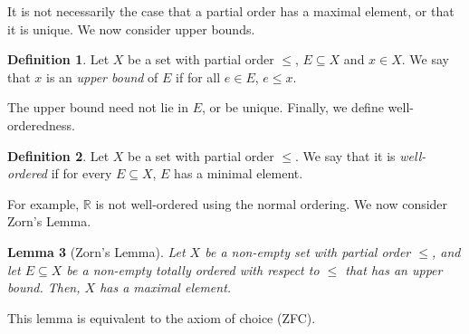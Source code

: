 \documentclass[a4paper, openany]{memoir}
\theoremstyle{definition}
\newtheorem{definition}{Definition}[section]
\theoremstyle{plain}
\newtheorem{lemma}[definition]{Lemma}
\begin{document}
    \noindent It is not necessarily the case that a partial order has a maximal element, or that it is unique. We now consider upper bounds.
    \begin{definition}
        Let $X$ be a set with partial order $\leq$, $E \subseteq X$ and $x \in X$. We say that $x$ is an \emph{upper bound} of $E$ if for all $e \in E$, $e \leq x$.
    \end{definition}
    \noindent The upper bound need not lie in $E$, or be unique. Finally, we define well-orderedness.
    \begin{definition}
        Let $X$ be a set with partial order $\leq$. We say that it is \emph{well-ordered} if for every $E \subseteq X$, $E$ has a minimal element.
    \end{definition}
    \noindent For example, $\mathbb{R}$ is not well-ordered using the normal ordering. We now consider Zorn's Lemma.
    \begin{lemma}[Zorn's Lemma]
        Let $X$ be a non-empty set with partial order $\leq$, and let $E \subseteq X$ be a non-empty totally ordered with respect to $\leq$ that has an upper bound. Then, $X$ has a maximal element.
    \end{lemma}
    \noindent This lemma is equivalent to the axiom of choice (ZFC).
\end{document}
